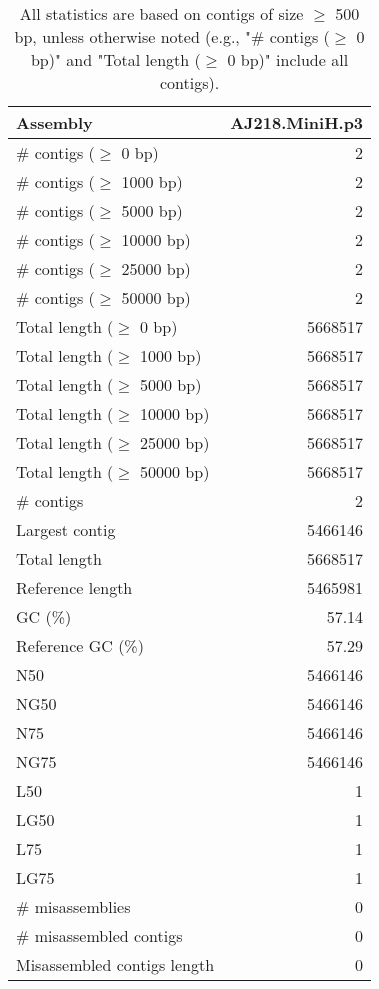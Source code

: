 \documentclass[12pt,a4paper]{article}
\begin{document}
\begin{table}[ht]
\begin{center}
\caption{All statistics are based on contigs of size $\geq$ 500 bp, unless otherwise noted (e.g., "\# contigs ($\geq$ 0 bp)" and "Total length ($\geq$ 0 bp)" include all contigs).}
\begin{tabular}{|l*{1}{|r}|}
\hline
Assembly & AJ218.MiniH.p3 \\ \hline
\# contigs ($\geq$ 0 bp) & 2 \\ \hline
\# contigs ($\geq$ 1000 bp) & 2 \\ \hline
\# contigs ($\geq$ 5000 bp) & 2 \\ \hline
\# contigs ($\geq$ 10000 bp) & 2 \\ \hline
\# contigs ($\geq$ 25000 bp) & 2 \\ \hline
\# contigs ($\geq$ 50000 bp) & 2 \\ \hline
Total length ($\geq$ 0 bp) & 5668517 \\ \hline
Total length ($\geq$ 1000 bp) & 5668517 \\ \hline
Total length ($\geq$ 5000 bp) & 5668517 \\ \hline
Total length ($\geq$ 10000 bp) & 5668517 \\ \hline
Total length ($\geq$ 25000 bp) & 5668517 \\ \hline
Total length ($\geq$ 50000 bp) & 5668517 \\ \hline
\# contigs & 2 \\ \hline
Largest contig & 5466146 \\ \hline
Total length & 5668517 \\ \hline
Reference length & 5465981 \\ \hline
GC (\%) & 57.14 \\ \hline
Reference GC (\%) & 57.29 \\ \hline
N50 & 5466146 \\ \hline
NG50 & 5466146 \\ \hline
N75 & 5466146 \\ \hline
NG75 & 5466146 \\ \hline
L50 & 1 \\ \hline
LG50 & 1 \\ \hline
L75 & 1 \\ \hline
LG75 & 1 \\ \hline
\# misassemblies & 0 \\ \hline
\# misassembled contigs & 0 \\ \hline
Misassembled contigs length & 0 \\ \hline

\end{tabular}
\end{center}
\end{table}
\end{document}
